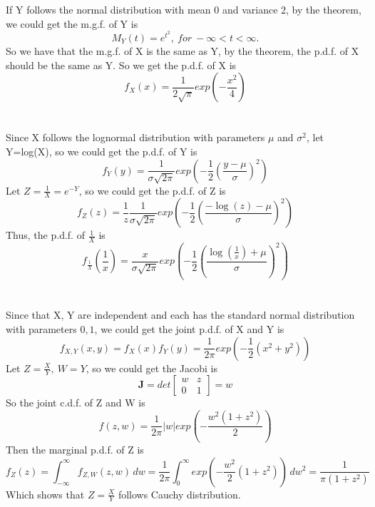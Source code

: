 \documentclass[10.5pt]{article}
\begin{document}
\section{}
If Y follows the normal distribution with mean 0 and variance 2, by the theorem, we could get the m.g.f. of Y is $$M_Y(t)=e^{t^2},~for~-\infty<t<\infty.$$\indent
So we have that the m.g.f. of X is the same as Y, by the theorem, the p.d.f. of X should be the same as Y. So we get the p.d.f. of X is $$f_X(x)=\frac{1}{2\sqrt{\pi}}exp(-\frac{x^2}{4})$$

\section{}
Since X follows the lognormal distribution with parameters $\mu$ and $\sigma^2$, let Y=log(X), so we could get the p.d.f. of Y is $$f_Y(y)=\frac{1}{\sigma \sqrt{2\pi}}exp\left(-\frac{1}{2}\left(\frac{y-\mu}{\sigma}\right)^2\right)$$\indent
Let $Z=\frac{1}{X}=e^{-Y}$, so we could get the p.d.f. of Z is $$f_Z(z)=\frac{1}{z}\frac{1}{\sigma \sqrt{2\pi}}exp\left(-\frac{1}{2}\left(\frac{-\log(z)-\mu}{\sigma}\right)^2\right)$$\indent
Thus, the p.d.f. of $\frac{1}{X}$ is $$f_{\frac{1}{X}}\left(\frac{1}{x}\right)=\frac{x}{\sigma \sqrt{2\pi}}exp\left(-\frac{1}{2}\left(\frac{\log(\frac{1}{x})+\mu}{\sigma}\right)^2\right)$$

\section{}
Since that X, Y are independent and each has the standard normal distribution with parameters $0,1$, we could get the joint p.d.f. of X and Y is $$f_{X,Y}(x,y)=f_X(x)f_Y(y)=\frac{1}{2\pi}exp\left(-\frac{1}{2}\left(x^2+y^2\right)\right)$$\indent
Let $Z=\frac{X}{Y},~W=Y$, so we could get the Jacobi is $$\mathbf{J}=det\begin{bmatrix}
    w & z\\
    0 & 1
\end{bmatrix}=w$$\indent
So the joint c.d.f. of Z and W is $$f(z,w)=\frac{1}{2\pi}\left\lvert w\right\rvert exp\left(-\frac{w^2(1+z^2)}{2}\right)$$\indent
Then the marginal p.d.f. of Z is $$f_Z(z)=\int_{-\infty}^{\infty}f_{Z,W}(z,w)\,dw=\frac{1}{2\pi}\int_{0}^{\infty}exp\left(-\frac{w^2}{2}(1+z^2)\right)\,dw^2=\frac{1}{\pi(1+z^2)}$$\indent
Which shows that $Z=\frac{X}{Y}$ follows Cauchy distribution.

\section{}
\end{document}
